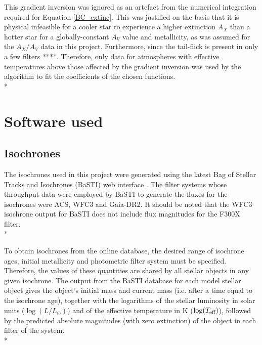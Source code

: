 \documentclass[12pt, a4paper]{report}
\begin{document}
This gradient inversion was ignored as an artefact from the numerical integration required for Equation \ref{BC_extinc}. This was justified on the basis that it is physical infeasible for a cooler star to experience a higher extinction $A_{X}$ than a hotter star for a globally-constant $A_{V}$ value and metallicity, as was assumed for the $A_{X}/A_{V}$ data in this project. Furthermore, since the tail-flick is present in only a few filters ****. Therefore, only data for atmospheres with effective temperatures above those affected by the gradient inversion was used by the algorithm to fit the coefficients of the chosen functions.\\*


\section{Software used}
\subsection{Isochrones}
The isochrones used in this project were generated using the latest Bag of Stellar Tracks and Isochrones (BaSTI) web interface \citep{2004ApJ...612..168P,2018ApJ...856..125H}. The filter systems whose throughput data were employed by BaSTI to generate the fluxes for the isochrones were ACS, WFC3 and Gaia-DR2. It should be noted that the WFC3 isochrone output for BaSTI does not include flux magnitudes for the F300X filter.\\*

To obtain isochrones from the online database, the desired range of isochrone ages, initial metallicity and photometric filter system must be specified. Therefore, the values of these quantities are shared by all stellar objects in any given isochrone. The output from the BaSTI database for each model stellar object gives the object's initial mass and current mass (i.e. after a time equal to the isochrone age), together with the logarithms of the stellar luminosity in solar units ($\log(L/L_{\odot})$) and of the effective temperature in K ($\log(T_{\textnormal{eff}})$), followed by the predicted absolute magnitudes (with zero extinction) of the object in each filter of the system. \\*
\end{document}
